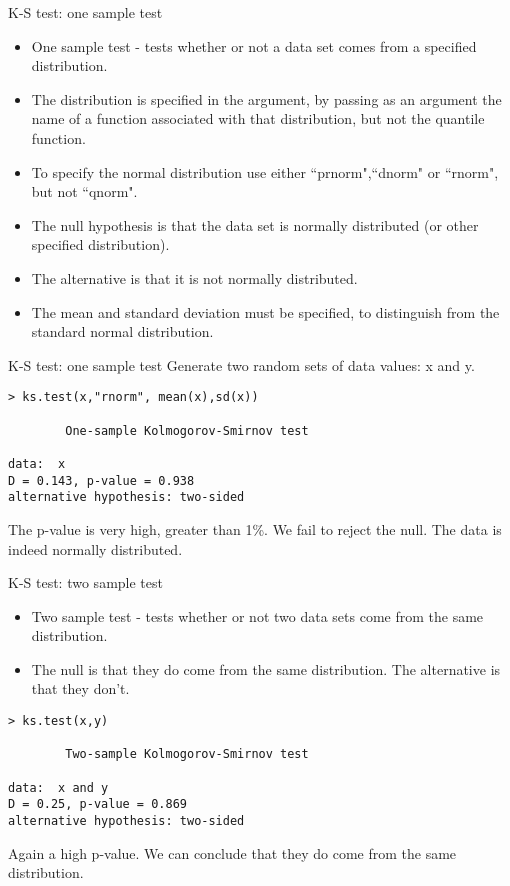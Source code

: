 \documentclass[pdf,default,slideColor,colorBG]{prosper}
\begin{document}
\begin{slide}{K-S test: one sample test}

\begin{itemize}
\item One sample test - tests whether or not a data set comes from a specified distribution.
\item The distribution is specified in the argument, by passing as an argument the name of a function associated with that distribution, but not the quantile function.
\item To specify the normal distribution use either ``prnorm",``dnorm" or ``rnorm", but not ``qnorm".
\item The null hypothesis is that the data set is normally distributed (or other specified distribution).
\item The alternative is that it is not normally distributed.
\item The mean and standard deviation must be specified, to distinguish from the standard normal distribution.

\end{itemize}
\end{slide}
\begin{slide}{K-S test: one sample test}
Generate two random sets of data values: x and y.
\begin{verbatim}
> ks.test(x,"rnorm", mean(x),sd(x))

        One-sample Kolmogorov-Smirnov test

data:  x
D = 0.143, p-value = 0.938
alternative hypothesis: two-sided

\end{verbatim}

The p-value is very high, greater than 1\%. We fail to reject the null. The data is indeed normally distributed.

\end{slide}
\begin{slide}{K-S test: two sample test}

\begin{itemize}
\item Two sample test - tests whether or not two data sets come from the same distribution.
\item The null is that they do come from the same distribution. The alternative is that they don't.
\end{itemize}

\begin{verbatim}
> ks.test(x,y)

        Two-sample Kolmogorov-Smirnov test

data:  x and y
D = 0.25, p-value = 0.869
alternative hypothesis: two-sided
\end{verbatim}
Again a high p-value. We can conclude that they do come from the same distribution.
\end{slide}
\end{document}
